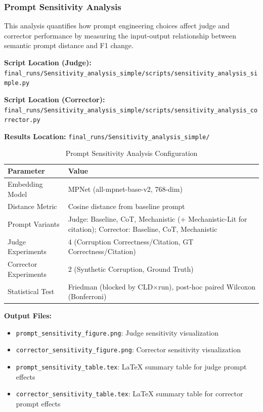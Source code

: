 \subsubsection{Prompt Sensitivity Analysis}

This analysis quantifies how prompt engineering choices affect judge and corrector performance by measuring the input-output relationship between semantic prompt distance and F1 change.

\textbf{Script Location (Judge):} \texttt{final\_runs/Sensitivity\_analysis\_simple/scripts/sensitivity\_analysis\_simple.py}

\textbf{Script Location (Corrector):} \texttt{final\_runs/Sensitivity\_analysis\_simple/scripts/sensitivity\_analysis\_corrector.py}

\textbf{Results Location:} \texttt{final\_runs/Sensitivity\_analysis\_simple/}

\begin{table}[H]
\centering
\caption{Prompt Sensitivity Analysis Configuration}
\label{tab:prompt_sensitivity_config}
\footnotesize
\begin{tabular}{@{}ll@{}}
\toprule
\textbf{Parameter} & \textbf{Value} \\
\midrule
Embedding Model & MPNet (all-mpnet-base-v2, 768-dim) \\
Distance Metric & Cosine distance from baseline prompt \\
Prompt Variants & Judge: Baseline, CoT, Mechanistic (+ Mechanistic-Lit for citation); Corrector: Baseline, CoT, Mechanistic \\
Judge Experiments & 4 (Corruption Correctness/Citation, GT Correctness/Citation) \\
Corrector Experiments & 2 (Synthetic Corruption, Ground Truth) \\
Statistical Test & Friedman (blocked by CLD$\times$run), post-hoc paired Wilcoxon (Bonferroni) \\
\bottomrule
\end{tabular}
\end{table}

\textbf{Output Files:}
\begin{itemize}[noitemsep]
    \item \texttt{prompt\_sensitivity\_figure.png}: Judge sensitivity visualization
    \item \texttt{corrector\_sensitivity\_figure.png}: Corrector sensitivity visualization
    \item \texttt{prompt\_sensitivity\_table.tex}: LaTeX summary table for judge prompt effects
    \item \texttt{corrector\_sensitivity\_table.tex}: LaTeX summary table for corrector prompt effects
\end{itemize}

